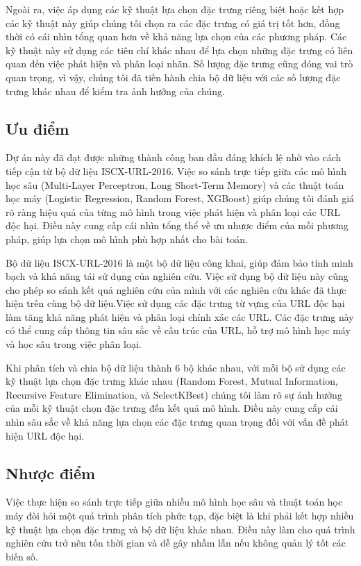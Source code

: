 \documentclass[13pt]{article}
\begin{document}
Ngoài ra, việc áp dụng các kỹ thuật lựa chọn đặc trưng riêng biệt hoặc kết hợp các kỹ thuật này giúp chúng tôi chọn ra các đặc trưng có giá trị tốt hơn, đồng thời có cái nhìn tổng quan hơn về khả năng lựa chọn của các phương pháp. Các kỹ thuật này sử dụng các tiêu chí khác nhau để lựa chọn những đặc trưng có liên quan đến việc phát hiện và phân loại nhãn. Số lượng đặc trưng cũng đóng vai trò quan trọng, vì vậy, chúng tôi đã tiến hành chia bộ dữ liệu với các số lượng đặc trưng khác nhau để kiểm tra ảnh hưởng của chúng.


\subsection{Ưu điểm}
Dự án này đã đạt được những thành công ban đầu đáng khích lệ nhờ vào cách tiếp cận từ bộ dữ liệu ISCX-URL-2016. Việc so sánh trực tiếp giữa các mô hình học sâu (Multi-Layer Perceptron, Long Short-Term Memory) và các thuật toán học máy (Logistic Regression, Random Forest, XGBoost) giúp chúng tôi đánh giá rõ ràng hiệu quả của từng mô hình trong việc phát hiện và phân loại các URL độc hại. Điều này cung cấp cái nhìn tổng thể về ưu nhược điểm của mỗi phương pháp, giúp lựa chọn mô hình phù hợp nhất cho bài toán.

Bộ dữ liệu ISCX-URL-2016 là một bộ dữ liệu công khai, giúp đảm bảo tính minh bạch và khả năng tái sử dụng của nghiên cứu. Việc sử dụng bộ dữ liệu này cũng cho phép so sánh kết quả nghiên cứu của mình với các nghiên cứu khác đã thực hiện trên cùng bộ dữ liệu.Việc sử dụng các đặc trưng từ vựng của URL độc hại làm tăng khả năng phát hiện và phân loại chính xác các URL. Các đặc trưng này có thể cung cấp thông tin sâu sắc về cấu trúc của URL, hỗ trợ mô hình học máy và học sâu trong việc phân loại.

Khi phân tích và chia bộ dữ liệu thành 6 bộ khác nhau, với mỗi bộ sử dụng các kỹ thuật lựa chọn đặc trưng khác nhau (Random Forest, Mutual Information, Recursive Feature Elimination, và SelectKBest) chúng tôi làm rõ sự ảnh hưởng của mỗi kỹ thuật chọn đặc trưng đến kết quả mô hình. Điều này cung cấp cái nhìn sâu sắc về khả năng lựa chọn các đặc trưng quan trọng đối với vấn đề phát hiện URL độc hại.

\subsection{Nhược điểm}
Việc thực hiện so sánh trực tiếp giữa nhiều mô hình học sâu và thuật toán học máy đòi hỏi một quá trình phân tích phức tạp, đặc biệt là khi phải kết hợp nhiều kỹ thuật lựa chọn đặc trưng và bộ dữ liệu khác nhau. Điều này làm cho quá trình nghiên cứu trở nên tốn thời gian và dễ gây nhầm lẫn nếu không quản lý tốt các biến số.
\end{document}
